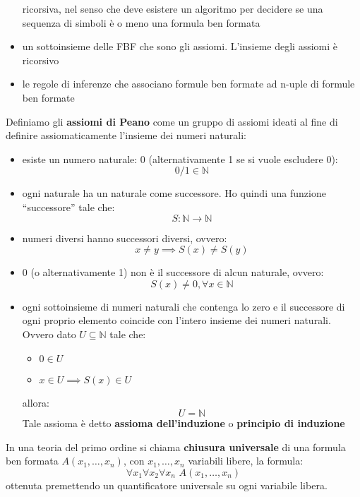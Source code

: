 \documentclass[a4paper,12pt, oneside]{book}
\begin{document}
\begin{shaded}
\begin{definizione}
\begin{itemize}
      ricorsiva, nel senso che deve esistere un algoritmo per decidere se una
      sequenza di simboli è o meno una formula ben formata 
      \item un sottoinsieme delle FBF che sono gli assiomi. L'insieme degli
      assiomi è ricorsivo
      \item le regole di inferenze che associano formule ben formate ad n-uple
      di formule ben formate
    \end{itemize}
  \end{definizione}
  \begin{definizione}
    Definiamo gli \textbf{assiomi di Peano} come un gruppo di assiomi ideati al
    fine di definire assiomaticamente l'insieme dei numeri naturali:
    \begin{itemize}
      \item esiste un numero naturale: 0 (alternativamente 1 se si vuole escludere
      0):
      \[0/1\in \mathbb{N}\]
      \item ogni naturale ha un naturale come successore. Ho quindi una funzione
      ``successore'' tale che:
      \[S:\mathbb{N}\to\mathbb{N}\]
      \item numeri diversi hanno successori diversi, ovvero:
      \[x\neq y\implies S(x)\neq S(y)\]
      \item 0 (o alternativamente 1) non è il successore di alcun naturale,
      ovvero:
      \[S(x)\neq 0, \forall x\in \mathbb{N}\]
      \item ogni sottoinsieme di numeri naturali che contenga lo zero e il
      successore di ogni proprio elemento coincide con l'intero insieme dei
      numeri 
      naturali. Ovvero dato $U\subseteq \mathbb{N}$ tale che:
      \begin{itemize}
        \item $0\in U$
        \item $x\in U\implies S(x)\in U$
      \end{itemize}
      allora:
      \[U=\mathbb{N}\]
      Tale assioma è detto \textbf{assioma dell'induzione} o \textbf{principio di
        induzione} 
    \end{itemize}
  \end{definizione}
  \begin{definizione}
    In una teoria del primo ordine si chiama \textbf{chiusura universale} di una
    formula ben formata $A(x_1,\ldots,x_n)$, con $x_1,\ldots,x_n$ variabili
    libere, la formula:
    \[\forall x_1\forall x_2\forall x_n\,\,A(x_1,\ldots,x_n)\]
    ottenuta premettendo un quantificatore universale su ogni variabile libera. 

\end{definizione}
\end{shaded}
\end{document}
